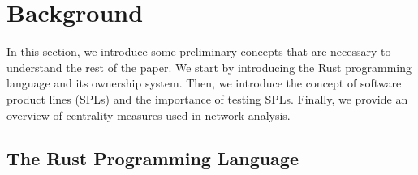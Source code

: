 \section{Background}\label{sec:bg}

In this section, we introduce some preliminary concepts that are necessary to understand the rest of the paper. 
We start by introducing the Rust programming language and its ownership system.
Then, we introduce the concept of software product lines (SPLs) and the importance of testing SPLs.
Finally, we provide an overview of centrality measures used in network analysis.

\subsection{The Rust Programming Language}\label{subsec:bg:rust}

